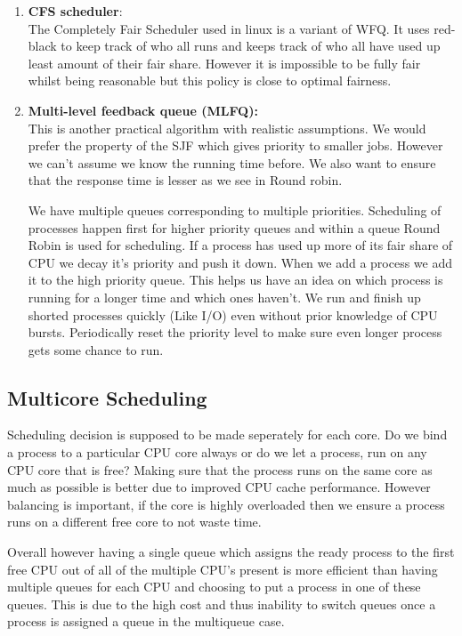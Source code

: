 \documentclass[12pt]{article}
\newcommand{\tbox}[1]{\noindent\fbox{\parbox{\textwidth}{#1}}}
\begin{document}
\begin{enumerate}
\item 
\textbf{CFS scheduler}:\\The Completely Fair Scheduler used in linux is a variant of WFQ. It uses red-black to keep track of who all runs and keeps track of who all have used up least amount of their fair share.
However it is impossible to be fully fair whilst being reasonable but this policy is close to optimal fairness.


\item \textbf{Multi-level feedback queue (MLFQ):} \\
This is another practical algorithm with realistic assumptions. We would prefer the property of the SJF which gives priority to smaller jobs. However we can't assume we know the running time before.
We also want to ensure that the response time is lesser as we see in Round robin. 

We have multiple queues corresponding to multiple priorities. Scheduling of processes happen first for higher priority queues and within a queue Round Robin is used for scheduling. If a process has used up more of its fair share of CPU we decay it's priority and push it down. When we 
add a process we add it to the high priority queue. This helps us have an idea on which process is running for a longer time and which ones haven't. We run and finish up shorted processes quickly (Like I/O) even without prior knowledge of CPU bursts. Periodically reset the priority level to make sure even longer
process gets some chance to run.
\end{enumerate}

\noindent\tbox{
    \begin{center}
    \textbf{\Huge Lecture 10}
    \end{center}
}

\subsection{Multicore Scheduling}
Scheduling decision is supposed to be made seperately for each core. Do we bind a process to a particular CPU core always or do we let a process,
run on any CPU core that is free? Making sure that the process runs on the same core as much as possible is better due to improved CPU cache performance.
However balancing is important, if the core is highly overloaded then we ensure a process runs on a different free core to not waste time. 

Overall however having
a single queue which assigns the ready process to the first free CPU out of all of the multiple CPU's present is more efficient than having
multiple queues for each CPU and choosing to put a process in one of these queues. This is due to the high cost and thus inability to switch queues once a process
is assigned a queue in the multiqueue case.
\end{document}
